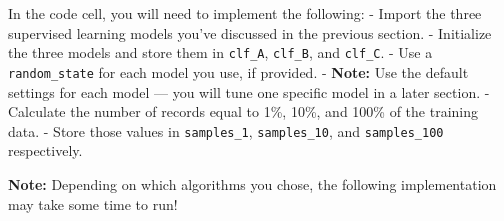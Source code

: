\documentclass[11pt]{article}
\begin{document}
In the code cell, you will need to implement the following: - Import the
three supervised learning models you've discussed in the previous
section. - Initialize the three models and store them in
\texttt{\textquotesingle{}clf\_A\textquotesingle{}},
\texttt{\textquotesingle{}clf\_B\textquotesingle{}}, and
\texttt{\textquotesingle{}clf\_C\textquotesingle{}}. - Use a
\texttt{\textquotesingle{}random\_state\textquotesingle{}} for each
model you use, if provided. - \textbf{Note:} Use the default settings
for each model --- you will tune one specific model in a later section.
- Calculate the number of records equal to 1\%, 10\%, and 100\% of the
training data. - Store those values in
\texttt{\textquotesingle{}samples\_1\textquotesingle{}},
\texttt{\textquotesingle{}samples\_10\textquotesingle{}}, and
\texttt{\textquotesingle{}samples\_100\textquotesingle{}} respectively.

\textbf{Note:} Depending on which algorithms you chose, the following
implementation may take some time to run!
\end{document}
